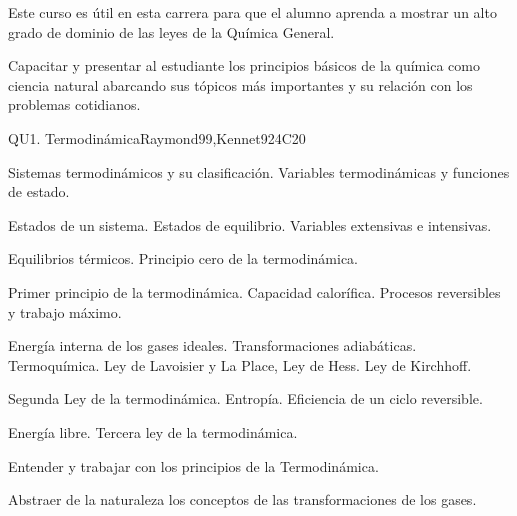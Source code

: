 \begin{syllabus}


\begin{justification}
Este curso es útil en esta carrera para que el alumno aprenda a mostrar un alto grado de dominio de las leyes de la Química General.
\end{justification}

\begin{goals}
\item Capacitar y presentar al estudiante los principios básicos de la química como ciencia natural abarcando sus tópicos más importantes y su relación con los problemas cotidianos.
\end{goals}

\begin{outcomes}
\item {}
\item {}
\end{outcomes}

\begin{competences}
    \item {}
\end{competences}

\begin{unit}{QU1. Termodinámica}{}{Raymond99,Kennet92}{4}{C20}
\begin{topics}
      \item Sistemas termodinámicos y su clasificación. Variables termodinámicas y funciones de estado.
      \item Estados de un sistema. Estados de equilibrio. Variables extensivas e intensivas.
      \item Equilibrios térmicos. Principio cero de la termodinámica.
      \item Primer principio de la termodinámica. Capacidad calorífica. Procesos reversibles y trabajo máximo.
      \item Energía interna de los gases ideales. Transformaciones adiabáticas. Termoquímica. Ley de Lavoisier y La Place, Ley de Hess. Ley de Kirchhoff.
      \item Segunda Ley de la termodinámica. Entropía. Eficiencia de un ciclo reversible.
	\item Energía libre. Tercera ley de la termodinámica.
   \end{topics}

   \begin{learningoutcomes}
      \item Entender y trabajar con los principios de la Termodinámica.
      \item Abstraer de la naturaleza los conceptos de las transformaciones de los gases.
   \end{learningoutcomes}
\end{unit}


\end{syllabus}

